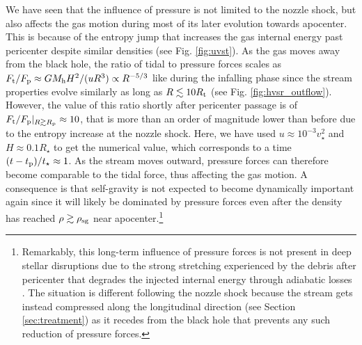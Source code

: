 \documentclass[a4paper,fleqn,usenatbib]{mnras}
\newcommand{\rstar}{R_{\star}}
\newcommand{\rp}{R_{\rm p}}
\newcommand{\rt}{R_{\rm t}}
\newcommand{\mh}{M_{\rm h}}
\newcommand{\tstar}{t_{\star}}
\begin{document}
We have seen that the influence of pressure is not limited to the nozzle shock, but also affects the gas motion during most of its later evolution towards apocenter. This is because of the entropy jump that increases the gas internal energy past pericenter despite similar densities (see Fig. \ref{fig:uvst}). As the gas moves away from the black hole, the ratio of tidal to pressure forces scales as $F_{\rm t}/F_{\rm p} \approx G \mh H^2/(u R^3) \propto R^{-5/3}$ like during the infalling phase since the stream properties evolve similarly as long as $R\lesssim 10 \rt$ (see Fig. \ref{fig:hvsr_outflow}). However, the value of this ratio shortly after pericenter passage is of $F_{\rm t}/F_{\rm p}|_{R\gtrsim\rp} \approx 10$, that is more than an order of magnitude lower than before due to the entropy increase at the nozzle shock. Here, we have used $u\approx 10^{-3} v^2_{\star}$ and $H\approx 0.1 \rstar$ to get the numerical value, which corresponds to a time $(t - t_{\rm p})/\tstar \approx 1$. As the stream moves outward, pressure forces can therefore become comparable to the tidal force, thus affecting the gas motion. A consequence is that self-gravity is not expected to become dynamically important again since it will likely be dominated by pressure forces even after the density has reached $\rho \gtrsim \rho_{\rm sg}$ near apocenter.\footnote{Remarkably, this long-term influence of pressure forces is not present in deep stellar disruptions due to the strong stretching experienced by the debris after pericenter that degrades the injected internal energy through adiabatic losses \citep{guillochon2009}. The situation is different following the nozzle shock because the stream gets instead compressed along the longitudinal direction (see Section \ref{sec:treatment}) as it recedes from the black hole that prevents any such reduction of pressure forces.}
\end{document}
